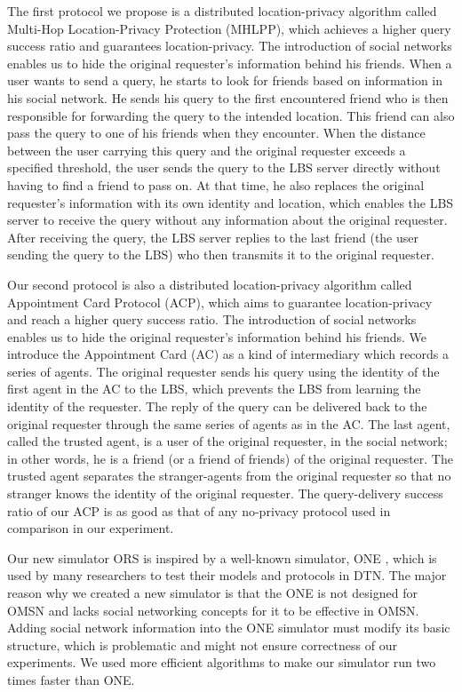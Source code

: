 The first protocol we propose is a distributed location-privacy algorithm called Multi-Hop Location-Privacy Protection (MHLPP), which achieves a higher query success ratio and guarantees location-privacy. The introduction of social networks enables us to hide the original requester's information behind his friends. When a user wants to send a query, he starts to look for friends based on information in his social network. He sends his query to the first encountered friend who is then responsible for forwarding the query to the intended location. This friend can also pass the query to one of his friends when they encounter. When the distance between the user carrying this query and the original requester exceeds a specified threshold, the user sends the query to the LBS server directly without having to find a friend to pass on. At that time, he also replaces the original requester's information with its own identity and location, which enables the LBS server to receive the query without any information about the original requester. After receiving the query, the LBS server replies to the last friend (the user sending the query to the LBS) who then transmits it to the original requester.

Our second protocol is also a distributed location-privacy algorithm called Appointment Card Protocol (ACP), which aims to guarantee location-privacy and reach a higher query success ratio. The introduction of social networks enables us to hide the original requester's information behind his friends. We introduce the Appointment Card (AC) as a kind of intermediary which records a series of agents. The original requester sends his query using the identity of the first agent in the AC to the LBS, which prevents the LBS from learning the identity of the requester. The reply of the query can be delivered back to the original requester through the same series of agents as in the AC. The last agent, called the trusted agent, is a user of the original requester, in the social network; in other words, he is a friend (or a friend of friends) of the original requester. The trusted agent separates the stranger-agents from the original requester so that no stranger knows the identity of the original requester. The query-delivery success ratio of our ACP is as good as that of any no-privacy protocol used in comparison in our experiment.

Our new simulator ORS is inspired by a well-known simulator, ONE \cite {C35}, which is used by many researchers to test their models and protocols in DTN. The major reason why we created a new simulator is that the ONE is not designed for OMSN and lacks social networking concepts for it to be effective in OMSN. Adding social network information into the ONE simulator must modify its basic structure, which is problematic and might not ensure correctness of our experiments. We used more efficient algorithms to make our simulator run two times faster than ONE.


